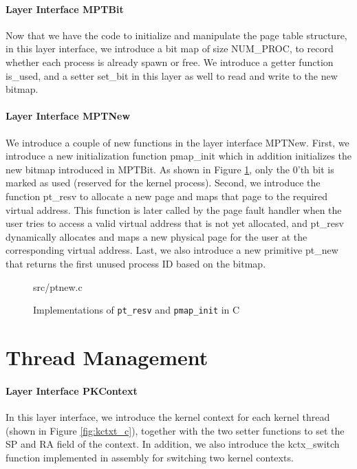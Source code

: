 \paragraph{Layer Interface MPTBit}

Now that we have the code to initialize and manipulate the page table structure, in this layer interface,
we introduce a bit map of size \textsf{NUM\_PROC}, to record whether each process is already spawn or
free. We introduce a getter function \textsf{is\_used}, and a setter \textsf{set\_bit} in this layer as well to
read and write to the new bitmap.


\paragraph{Layer Interface MPTNew}

We introduce a couple of new functions in the layer interface MPTNew.
First, we introduce a new initialization function \textsf{pmap\_init} which in addition initializes the new bitmap introduced in MPTBit.
As shown in Figure \ref{fig:ptnew_c}, only the 0'th bit is marked as used (reserved for the kernel process).
Second, we introduce the function \textsf{pt\_resv} to allocate a new page and maps that page to the required virtual address.
This function is later called by the page fault handler when the user tries to access a valid virtual address that is not yet allocated,
and \textsf{pt\_resv} dynamically allocates and maps a new physical page for the user at the corresponding virtual address.
Last, we also introduce a new primitive \textsf{pt\_new} that returns the first unused process ID based on the bitmap.

\begin{figure}
	 {src/ptnew.c}
	\caption{Implementations of \texttt{pt\_resv} and \texttt{pmap\_init} in C}
	\label{fig:ptnew_c}
\end{figure}


\section{Thread Management}

\paragraph{Layer Interface PKContext}

In this layer interface, we introduce the kernel context for each kernel thread (shown in Figure \ref{fig:kctxt_c}),
together with the two setter functions to set the \textsf{SP} and \textsf{RA} field of the context.
In addition, we also introduce the \textsf{kctx\_switch} function implemented in assembly for switching two kernel contexts.

